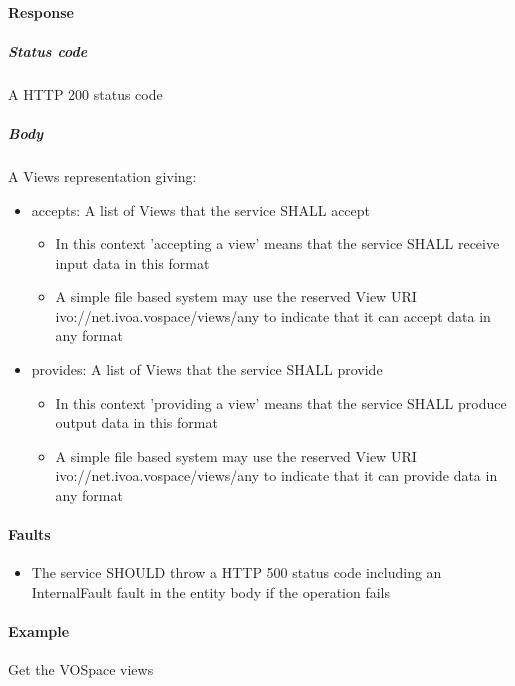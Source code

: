 \documentclass[11pt,a4paper]{ivoa}
\begin{document}
\paragraph{Response}
\subparagraph{Status code} A HTTP 200 status code
\subparagraph{Body}
A Views representation giving:
\begin{itemize}
    \item accepts: A list of Views that the service SHALL accept
    \begin{itemize}
        \item In this context 'accepting a view' means that the service SHALL receive input data in this format
        \item A simple file based system may use the reserved View URI ivo://net.ivoa.vospace/views/any to indicate that it can accept data in any format
    \end{itemize}
    \item provides: A list of Views that the service SHALL provide
    \begin{itemize}
        \item In this context 'providing a view' means that the service SHALL produce output data in this format
        \item A simple file based system may use the reserved View URI ivo://net.ivoa.vospace/views/any to indicate that it can provide data in any format
    \end{itemize}
\end{itemize}

\paragraph{Faults}
\begin{itemize}
    \item The service SHOULD throw a HTTP 500 status code including an InternalFault fault in the entity body if the operation fails
\end{itemize}

\paragraph{Example}
Get the VOSpace views
\end{document}
